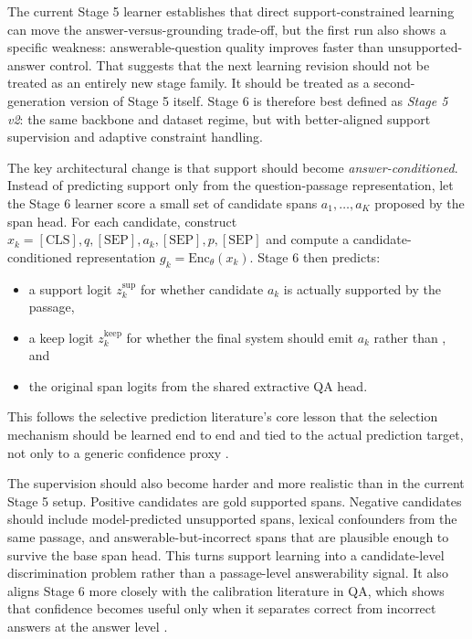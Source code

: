 The current Stage 5 learner establishes that direct support-constrained
learning can move the answer-versus-grounding trade-off, but the first run also
shows a specific weakness:
answerable-question quality improves faster than unsupported-answer control.
That suggests that the next learning revision should not be treated as an
entirely new stage family.
It should be treated as a second-generation version of Stage 5 itself.
Stage 6 is therefore best defined as \emph{Stage 5 v2}:
the same backbone and dataset regime, but with better-aligned support
supervision and adaptive constraint handling.

The key architectural change is that support should become
\emph{answer-conditioned}.
Instead of predicting support only from the question-passage representation,
let the Stage 6 learner score a small set of candidate spans
\(a_1, \dots, a_K\)
proposed by the span head.
For each candidate, construct
\(
  x_k = [\mathrm{CLS}], q, [\mathrm{SEP}], a_k, [\mathrm{SEP}], p, [\mathrm{SEP}]
\)
and compute a candidate-conditioned representation
\(
  g_k = \mathrm{Enc}_{\theta}(x_k)
\).
Stage 6 then predicts:
\begin{itemize}[leftmargin=1.25em]
  \item a support logit
  \(z_k^{\mathrm{sup}}\)
  for whether candidate \(a_k\) is actually supported by the passage,
  \item a keep logit
  \(z_k^{\mathrm{keep}}\)
  for whether the final system should emit \(a_k\) rather than \abstain, and
  \item the original span logits from the shared extractive QA head.
\end{itemize}
This follows the selective prediction literature's core lesson that the
selection mechanism should be learned end to end and tied to the actual
prediction target, not only to a generic confidence proxy
\citep{geifman2019selectivenet,liu2019deep,yoshikawa2023selectivelama,srinivasan2024selective}.

The supervision should also become harder and more realistic than in the
current Stage 5 setup.
Positive candidates are gold supported spans.
Negative candidates should include model-predicted unsupported spans, lexical
confounders from the same passage, and answerable-but-incorrect spans that are
plausible enough to survive the base span head.
This turns support learning into a candidate-level discrimination problem rather
than a passage-level answerability signal.
It also aligns Stage 6 more closely with the calibration literature in QA,
which shows that confidence becomes useful only when it separates correct from
incorrect answers at the answer level
\citep{jiang2021how,zhang2021knowing,si2022reexamining}.

